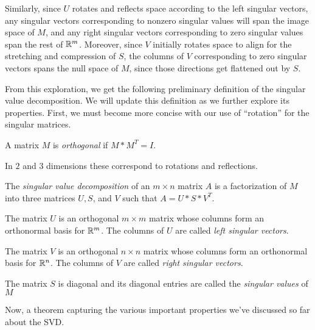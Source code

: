 \documentclass{ximera}
\begin{document}
\begin{problem}
\begin{feedback}
    Similarly, since $U$ rotates and reflects space according to the left singular vectors, any singular vectors corresponding to nonzero singular values will span the image space of $M$, and any right singular vectors corresponding to zero singular values span the rest of $\mathbb{R}^m$. Moreover, since $V$ initially rotates space to align for the stretching and compression of $S$, the columns of $V$ corresponding to zero singular vectors spans the null space of $M$, since those directions get flattened out by $S$.

  \end{feedback}

\end{problem}

From this exploration, we get the following preliminary definition of the singular value decomposition. We will update this definition as we further explore its properties. First, we must become more concise with our use of ``rotation'' for the singular matrices.

\begin{definition}

  A matrix $M$ is \emph{orthogonal} if $M*M^T=I$. 

  In $2$ and $3$ dimensions these correspond to rotations and reflections.

\end{definition}

\begin{definition}

  The \emph{singular value decomposition} of an $m\times n$ matrix $A$ is a factorization of $M$ into three matrices $U, S$, and $V$ such that $A=U*S*V^T$.

  The matrix $U$ is an orthogonal $m\times m$ matrix whose columns form an orthonormal basis for $\mathbb{R}^m$. The columns of $U$ are called \emph{left singular vectors}.

  The matrix $V$ is an orthogonal $n\times n$ matrix whose columns form an orthonormal basis for $\mathbb{R}^n$. The columns of $V$ are called \emph{right singular vectors}.

  The matrix $S$ is diagonal and its diagonal entries are called the \emph{singular values} of $M$

\end{definition}

Now, a theorem capturing the various important properties we've discussed so far about the SVD.
\end{document}
